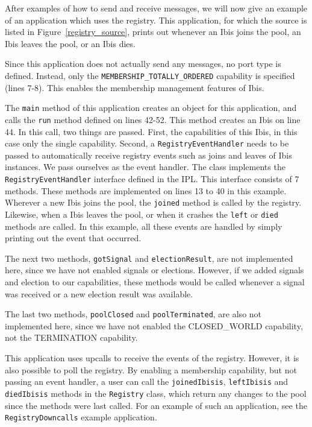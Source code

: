 After examples of how to send and receive messages, we will now give an
example of an application which uses the registry. This application,
for which the source is listed in Figure~\ref{registry_source}, prints
out whenever an Ibis joins the pool, an Ibis leaves the pool, or an Ibis
dies.

Since this application does not actually send any messages, no port type
is defined. Instead, only the \texttt{MEMBERSHIP\_TOTALLY\_ORDERED}
capability is specified (lines 7-8). This enables the membership
management features of Ibis.

The \texttt{main} method of this application creates an object for this
application, and calls the \texttt{run} method defined on lines 42-52.
This method creates an Ibis on line 44. In this call, two things are
passed. First, the capabilities of this Ibis, in this case only the
single capability. Second, a \texttt{RegistryEventHandler} needs to be
passed to automatically receive registry events such as joins and leaves
of Ibis instances. We pass ourselves as the event handler. The class
implements the \texttt{RegistryEventHandler} interface defined in the
IPL. This interface consists of 7 methods. These methods are implemented
on lines 13 to 40 in this example. Wherever a new Ibis joins the pool,
the \texttt{joined} method is called by the registry. Likewise, when a
Ibis leaves the pool, or when it crashes the \texttt{left} or
\texttt{died} methods are called. In this example, all these events are
handled by simply printing out the event that occurred.

The next two methods, \texttt{gotSignal} and \texttt{electionResult}, are
not implemented here, since we have not enabled signals or elections.
However, if we added signals and election to our capabilities, these
methods would be called whenever a signal was received or a new election
result was available.

The last two methods,
\texttt{poolClosed} and \texttt{poolTerminated}, are
also not implemented here, since we have not enabled the CLOSED\_WORLD
capability, not the TERMINATION capability.

This application uses upcalls to receive the events of the registry.
However, it is also possible to poll the registry. By enabling a
membership capability, but not passing an event handler, a user can call
the \texttt{joinedIbisis}, \texttt{leftIbisis} and \texttt{diedIbisis}
methods in the \texttt{Registry} class, which return any changes to the
pool since the methods were last called. For an example of such an
application, see the \texttt{RegistryDowncalls} example application.

